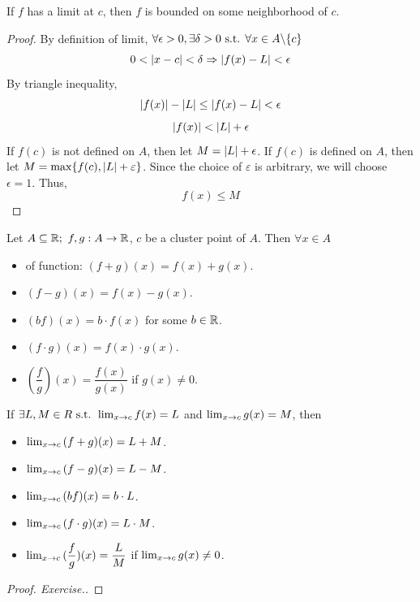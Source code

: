 \documentclass[a4paper,12pt]{article}
\begin{document}
\begin{theorem}
    If \(f\) has a limit at \(c\), then \(f\) is bounded on some neighborhood of \(c\).
    \begin{proof}
        By definition of limit, \(\forall \epsilon>0, \exists \delta>0 \text{ s.t. } \forall x\in A\backslash\{c \}\)
        \[0<\left\lvert x-c\right\rvert<\delta\Rightarrow\left\lvert f(x)-L\right\rvert<\epsilon\]
        By triangle inequality,
        \[\left\lvert f(x)\right\rvert-\left\lvert L\right\rvert\le\left\lvert f(x)-L\right\rvert<\epsilon\]
        \[\left\lvert f(x)\right\rvert<\left\lvert L\right\rvert+\epsilon\]
        If \(f(c)\) is not defined on \(A\), then let \(M=\left\lvert L\right\rvert+\epsilon\). If \(f(c)\) is defined on \(A\), 
        then let \(M=\max\{f(c), \left\lvert L\right\rvert+\varepsilon\}\). Since the choice of \(\varepsilon\) is arbitrary, 
        we will choose \(\epsilon=1\). Thus, 
        \[f(x)\le M\]
    \end{proof}
\end{theorem}

\begin{definition}
    Let \(A\subseteq\R;\ f,g:A\rightarrow\R\), \(c \) be a cluster point of \(A\). Then \(\forall x\in A\)
    \begin{itemize}
        \item {} of function: \((f+g)(x)=f(x)+g(x)\).
        \item {} \((f-g)(x)=f(x)-g(x)\).
        \item {} \((bf)(x)=b\cdot f(x)\) for some \(b\in \mathbb{R}\).
        \item {} \((f\cdot g)(x)=f(x)\cdot g(x)\).
        \item {} \((\dfrac{f}{g})(x)=\dfrac{f(x)}{g(x)}\) if \( g(x)\neq 0\).\\
    \end{itemize}
\end{definition}

\begin{theorem}
    If \(\exists L,M\in R\text{ s.t. }\lim_{x\rightarrow c } {f(x )}=L \) and \(\lim_{x\rightarrow c } {g(x )}=M\), then 
    \begin{itemize}
        \item \(\lim_{x\rightarrow c} {(f+g)(x)}=L+M\).
        \item \(\lim_{x\rightarrow c} {(f-g)(x)}=L-M\).
        \item \(\lim_{x\rightarrow c} {(bf)(x)}=b\cdot L\).
        \item \(\lim_{x\rightarrow c} {(f\cdot g)(x)}=L\cdot M\).
        \item \(\lim_{x\rightarrow c} {(\dfrac{f}{g})(x)}=\dfrac{L }{M}\) if \(\lim_{x\rightarrow c } {g(x )}\neq 0\).
    \end{itemize}

    \begin{proof}[Proof. Exercise.]
        
    \end{proof}
\end{theorem}
\end{document}
